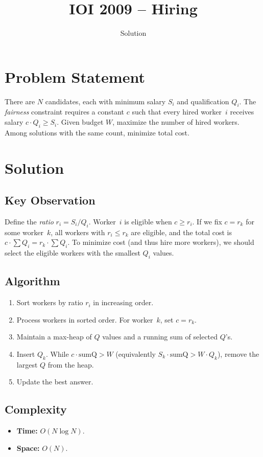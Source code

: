 \documentclass[11pt,a4paper]{article}
\title{IOI 2009 -- Hiring}
\author{Solution}
\date{}
\begin{document}
\maketitle

\section{Problem Statement}
There are $N$ candidates, each with minimum salary $S_i$ and qualification $Q_i$. The \emph{fairness} constraint requires a constant $c$ such that every hired worker~$i$ receives salary $c \cdot Q_i \ge S_i$. Given budget $W$, maximize the number of hired workers. Among solutions with the same count, minimize total cost.

\section{Solution}

\subsection{Key Observation}
Define the \emph{ratio} $r_i = S_i / Q_i$. Worker~$i$ is eligible when $c \ge r_i$. If we fix $c = r_k$ for some worker~$k$, all workers with $r_i \le r_k$ are eligible, and the total cost is $c \cdot \sum Q_i = r_k \cdot \sum Q_i$. To minimize cost (and thus hire more workers), we should select the eligible workers with the smallest $Q_i$ values.

\subsection{Algorithm}
\begin{enumerate}
    \item Sort workers by ratio $r_i$ in increasing order.
    \item Process workers in sorted order. For worker~$k$, set $c = r_k$.
    \item Maintain a max-heap of $Q$ values and a running sum of selected $Q$'s.
    \item Insert $Q_k$. While $c \cdot \text{sumQ} > W$ (equivalently $S_k \cdot \text{sumQ} > W \cdot Q_k$), remove the largest $Q$ from the heap.
    \item Update the best answer.
\end{enumerate}

\subsection{Complexity}
\begin{itemize}
    \item \textbf{Time:} $O(N \log N)$.
    \item \textbf{Space:} $O(N)$.
\end{itemize}
\end{document}
